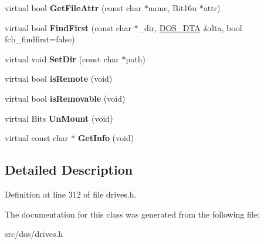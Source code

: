 \begin{DoxyCompactItemize}
\item 
\hypertarget{classphysfscdromDrive_ab912fc3e100db700805d05cd06716630}{virtual bool {\bfseries Get\-File\-Attr} (const char $\ast$name, Bit16u $\ast$attr)}\label{classphysfscdromDrive_ab912fc3e100db700805d05cd06716630}

\item 
\hypertarget{classphysfscdromDrive_ae13118f6b51622e933dc536ecea57258}{virtual bool {\bfseries Find\-First} (const char $\ast$\-\_\-dir, \hyperlink{classDOS__DTA}{D\-O\-S\-\_\-\-D\-T\-A} \&dta, bool fcb\-\_\-findfirst=false)}\label{classphysfscdromDrive_ae13118f6b51622e933dc536ecea57258}

\item 
\hypertarget{classphysfscdromDrive_ac73dc48b4346379edcdc2c42c502380a}{virtual void {\bfseries Set\-Dir} (const char $\ast$path)}\label{classphysfscdromDrive_ac73dc48b4346379edcdc2c42c502380a}

\item 
\hypertarget{classphysfscdromDrive_a39c3bc30452a8ecea465111831e5e7a6}{virtual bool {\bfseries is\-Remote} (void)}\label{classphysfscdromDrive_a39c3bc30452a8ecea465111831e5e7a6}

\item 
\hypertarget{classphysfscdromDrive_a2fd25800d56f447a0ec1550ec90a24ff}{virtual bool {\bfseries is\-Removable} (void)}\label{classphysfscdromDrive_a2fd25800d56f447a0ec1550ec90a24ff}

\item 
\hypertarget{classphysfscdromDrive_a99c7363ec5b3a0ca597c10e4f6dc2ecc}{virtual Bits {\bfseries Un\-Mount} (void)}\label{classphysfscdromDrive_a99c7363ec5b3a0ca597c10e4f6dc2ecc}

\item 
\hypertarget{classphysfscdromDrive_ad222bd4e5f133f63e2dd3713384298b8}{virtual const char $\ast$ {\bfseries Get\-Info} (void)}\label{classphysfscdromDrive_ad222bd4e5f133f63e2dd3713384298b8}

\end{DoxyCompactItemize}


\subsection{Detailed Description}


Definition at line 312 of file drives.\-h.



The documentation for this class was generated from the following file\-:\begin{DoxyCompactItemize}
\item 
src/dos/drives.\-h\end{DoxyCompactItemize}
